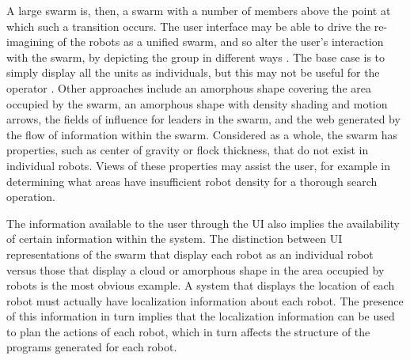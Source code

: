 A large swarm is, then, a swarm with a number of members above the point at which such a transition occurs. 
The user interface may be able to drive the re-imagining of the robots as a unified swarm, and so alter the user's interaction with the swarm, by depicting the group in different ways \citep{manning2015heuristic}.
The base case is to simply display all the units as individuals, but this may not be useful for the operator \citep{coppin2012controlling}. 
Other approaches include an amorphous shape covering the area occupied by the swarm, an amorphous shape with density shading and motion arrows, the fields of influence for leaders in the swarm, and the web generated by the flow of information within the swarm. 
Considered as a whole, the swarm has properties, such as center of gravity or flock thickness, that do not exist in individual robots. 
Views of these properties may assist the user, for example in determining what areas have insufficient robot density for a thorough search operation. 

The information available to the user through the UI also implies the availability of certain information within the system. 
The distinction between UI representations of the swarm that display each robot as an individual robot versus those that display a cloud or amorphous shape in the area occupied by robots is the most obvious example. 
A system that displays the location of each robot must actually have localization information about each robot.
The presence of this information in turn implies that the localization information can be used to plan the actions of each robot, which in turn affects the structure of the programs generated for each robot. 

